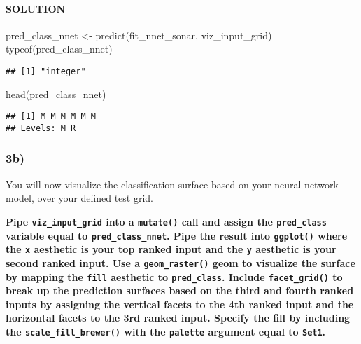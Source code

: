 \documentclass[
]{article}
\newenvironment{Shaded}{\begin{snugshade}}{\end{snugshade}}
\newcommand{\FunctionTok}[1]{\textcolor[rgb]{0.00,0.00,0.00}{#1}}
\newcommand{\NormalTok}[1]{#1}
\newcommand{\OtherTok}[1]{\textcolor[rgb]{0.56,0.35,0.01}{#1}}
\begin{document}
\hypertarget{solution-11}{%
\paragraph{SOLUTION}\label{solution-11}}

\begin{Shaded}
\begin{Highlighting}[]
\NormalTok{pred\_class\_nnet }\OtherTok{\textless{}{-}} \FunctionTok{predict}\NormalTok{(fit\_nnet\_sonar, viz\_input\_grid)}
\FunctionTok{typeof}\NormalTok{(pred\_class\_nnet)}
\end{Highlighting}
\end{Shaded}

\begin{verbatim}
## [1] "integer"
\end{verbatim}

\begin{Shaded}
\begin{Highlighting}[]
\FunctionTok{head}\NormalTok{(pred\_class\_nnet)}
\end{Highlighting}
\end{Shaded}

\begin{verbatim}
## [1] M M M M M M
## Levels: M R
\end{verbatim}

\hypertarget{b-2}{%
\subsubsection{3b)}\label{b-2}}

You will now visualize the classification surface based on your neural
network model, over your defined test grid.

\textbf{Pipe \texttt{viz\_input\_grid} into a \texttt{mutate()} call and
assign the \texttt{pred\_class} variable equal to
\texttt{pred\_class\_nnet}. Pipe the result into \texttt{ggplot()} where
the \texttt{x} aesthetic is your top ranked input and the \texttt{y}
aesthetic is your second ranked input. Use a \texttt{geom\_raster()}
geom to visualize the surface by mapping the \texttt{fill} aesthetic to
\texttt{pred\_class}. Include \texttt{facet\_grid()} to break up the
prediction surfaces based on the third and fourth ranked inputs by
assigning the vertical facets to the 4th ranked input and the horizontal
facets to the 3rd ranked input. Specify the fill by including the
\texttt{scale\_fill\_brewer()} with the \texttt{palette} argument equal
to \texttt{\textquotesingle{}Set1\textquotesingle{}}.}
\end{document}
